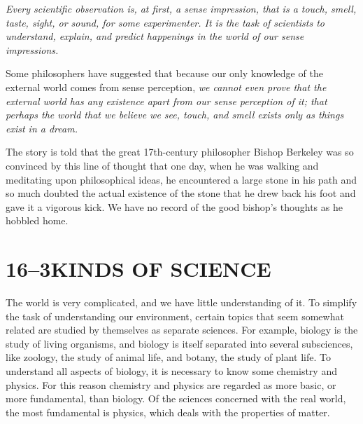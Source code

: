 \documentclass[11pt]{book}
\begin{document}
\emph{Every scientific observation is, at first, a sense impression, that is a
touch, smell, taste, sight, or sound, for some experimenter. It is the task of
scientists to understand, explain, and predict happenings in the world of our
sense impressions.}

Some philosophers have suggested that because our only knowledge of the
external world comes from sense perception, \emph{we cannot even prove that
the external world has any existence apart from our sense perception of it;
that perhaps the world that we believe we see, touch, and smell exists only as
things exist in a dream.}

The story is told that the great 17th-century philosopher Bishop Berkeley was
so convinced by this line of thought that one day, when he was walking and
meditating upon philosophical ideas, he encountered a large stone in his path
and so much doubted the actual existence of the stone that he drew back his
foot and gave it a vigorous kick. We have no record of the good bishop's
thoughts as he hobbled home.

\section*{16--3\quad KINDS OF SCIENCE}

The world is very complicated, and we have little understanding of it. To
simplify the task of understanding our environment, certain topics that seem
somewhat related are studied by themselves as separate sciences. For example,
biology is the study of living organisms, and biology is itself separated into
several subsciences, like zoology, the study of animal life, and botany, the
study of plant life. To understand all aspects of biology, it is necessary to
know some chemistry and physics. For this reason chemistry and physics are
regarded as more basic, or more fundamental, than biology. Of the sciences
concerned with the real world, the most fundamental is physics, which deals
with the properties of matter.
\end{document}
